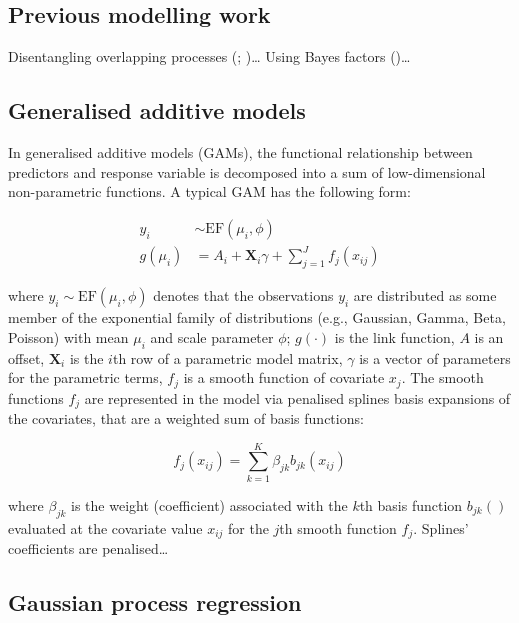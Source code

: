\documentclass[
  doc,
  floatsintext,
  longtable,
  a4paper,
  nolmodern,
  notxfonts,
  notimes,
  colorlinks=true,linkcolor=blue,citecolor=blue,urlcolor=blue]{apa7}
\begin{document}
\subsection{Previous modelling work}\label{previous-modelling-work}

Disentangling overlapping processes
(;
)\ldots{}
Using Bayes factors ()\ldots{}

\subsection{Generalised additive
models}\label{generalised-additive-models}

In generalised additive models (GAMs), the functional relationship
between predictors and response variable is decomposed into a sum of
low-dimensional non-parametric functions. A typical GAM has the
following form:

\[
\begin{aligned} 
y_{i} &\sim \mathrm{EF}\left(\mu_{i}, \phi\right)\\
g\left(\mu_i\right) &= A_{i} + \mathbf{X}_{i} \gamma + \sum_{j=1}^{J} f_{j}\left(x_{ij}\right)
\end{aligned}
\]

where \(y_{i} \sim \mathrm{EF}\left(\mu_{i}, \phi\right)\) denotes that
the observations \(y_{i}\) are distributed as some member of the
exponential family of distributions (e.g., Gaussian, Gamma, Beta,
Poisson) with mean \(\mu_{i}\) and scale parameter \(\phi\);
\(g(\cdot)\) is the link function, \(A\) is an offset,
\(\mathbf{X}_{i}\) is the \(i\)th row of a parametric model matrix,
\(\gamma\) is a vector of parameters for the parametric terms, \(f_{j}\)
is a smooth function of covariate \(x_{j}\). The smooth functions
\(f_{j}\) are represented in the model via penalised splines basis
expansions of the covariates, that are a weighted sum of basis
functions:

\[
f_{j}\left(x_{i j}\right) = \sum_{k=1}^K \beta_{jk} b_{jk}\left(x_{ij}\right)
\]

where \(\beta_{jk}\) is the weight (coefficient) associated with the
\(k\)th basis function \(b_{jk}()\) evaluated at the covariate value
\(x_{ij}\) for the \(j\)th smooth function \(f_{j}\). Splines'
coefficients are penalised\ldots{}

\subsection{Gaussian process
regression}\label{gaussian-process-regression}
\end{document}
